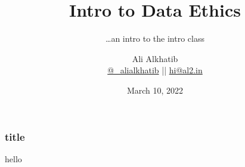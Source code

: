 \documentclass[aspectratio=169,17pt]{beamer} %
\title{Intro to Data Ethics}
\subtitle{\dots an intro to the intro class}
\author[Ali Alkhatib]{{Ali Alkhatib}\\
\href{http://twitter.com/_alialkhatib}{@\_alialkhatib} || \href{mailto:hi@al2.in}{hi@al2.in}}
\date{March 10, 2022}
\newcommand{\onlyinsubfile}[1]{#1}
\newcommand{\notinsubfile}[1]{}
\begin{document}
\begin{frame}
\titlepage
\end{frame}

\begin{frame}[t]\frametitle{title}
    hello


\end{frame}

\renewcommand{\onlyinsubfile}[1]{}
\renewcommand{\notinsubfile}[1]{#1}

\end{document}
